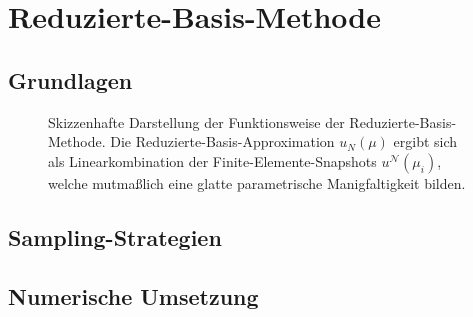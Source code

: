 \section{Reduzierte-Basis-Methode} %
\label{sec:grb:rb:reduzierte_basis_methode}

\subsection{Grundlagen} %
\label{sub:grb:rb:grundlagen}

\begin{figure}[tb]
    \centering
    
    \caption[%
    Skizzenhafte Darstellung der Funktionsweise der Reduzierte-Basis-Methode.
    ]{
        Skizzenhafte Darstellung der Funktionsweise der Reduzierte-Basis-Methode.
        Die Reduzierte-Basis-Approximation $u_{N}(\mu)$ ergibt sich als Linearkombination der Finite-Elemente-Snapshots $u^{\mathcal N}(\mu_{i})$, welche mutmaßlich eine glatte parametrische Manigfaltigkeit bilden.
        }
    \label{fig:figure1}
\end{figure}


\subsection{Sampling-Strategien} %
\label{sub:grb:rb:sampling_strategien}


\subsection{Numerische Umsetzung} %
\label{sub:grb:rb:numerische_umsetzung}



